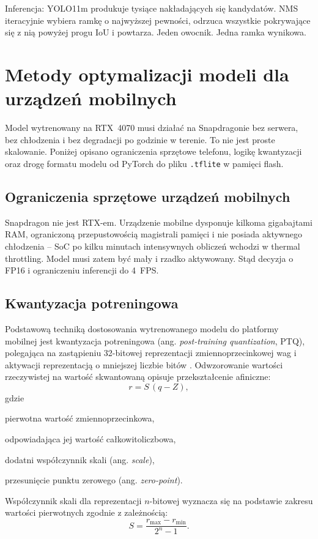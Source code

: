 Inferencja: YOLO11m produkuje tysiące nakładających się kandydatów. NMS iteracyjnie wybiera ramkę o najwyższej pewności, odrzuca wszystkie pokrywające się z nią powyżej progu IoU i powtarza. Jeden owocnik. Jedna ramka wynikowa.

\section{Metody optymalizacji modeli dla urządzeń mobilnych}
Model wytrenowany na RTX~4070 musi działać na Snapdragonie bez serwera, bez chłodzenia i bez degradacji po godzinie w terenie. To nie jest proste skalowanie. Poniżej opisano ograniczenia sprzętowe telefonu, logikę kwantyzacji oraz drogę formatu modelu od PyTorch do pliku \texttt{.tflite} w pamięci flash.

\subsection{Ograniczenia sprzętowe urządzeń mobilnych}
Snapdragon nie jest RTX-em. Urządzenie mobilne dysponuje kilkoma gigabajtami RAM, ograniczoną przepustowością magistrali pamięci i nie posiada aktywnego chłodzenia – SoC po kilku minutach intensywnych obliczeń wchodzi w thermal throttling. Model musi zatem być mały i rzadko aktywowany. Stąd decyzja o FP16 i ograniczeniu inferencji do 4~FPS.

\subsection{Kwantyzacja potreningowa}
Podstawową techniką dostosowania wytrenowanego modelu do platformy mobilnej jest kwantyzacja potreningowa (ang. \textit{post-training quantization}, PTQ), polegająca na zastąpieniu 32-bitowej reprezentacji zmiennoprzecinkowej wag i aktywacji reprezentacją o mniejszej liczbie bitów \cite{jacob2018quantization}. Odwzorowanie wartości rzeczywistej na wartość skwantowaną opisuje przekształcenie afiniczne:
\begin{equation}
r = S\,(q - Z),
\end{equation}
gdzie
\begin{description}[topsep=2pt,itemsep=-3pt]
 \item[$r$] pierwotna wartość zmiennoprzecinkowa,
 \item[$q$] odpowiadająca jej wartość całkowitoliczbowa,
 \item[$S$] dodatni współczynnik skali (ang. \textit{scale}),
 \item[$Z$] przesunięcie punktu zerowego (ang. \textit{zero-point}).
\end{description}
Współczynnik skali dla reprezentacji $n$-bitowej wyznacza się na podstawie zakresu wartości pierwotnych zgodnie z zależnością:
\begin{equation}
S = \frac{r_{\max} - r_{\min}}{2^{n} - 1}.
\end{equation}

